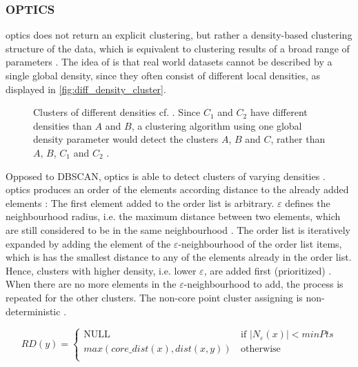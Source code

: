 \subsubsection{OPTICS}\label{subsec:optics}

\ac{optics} does not return an explicit clustering, but rather a density-based clustering structure of the data, 
which is equivalent to clustering results of a broad range of parameters \cite{OPTICS1999}.
The idea of \citeauthor{OPTICS1999} is that real world datasets cannot be described by a single global density, since they often consist of different local densities, 
as displayed in \autoref{fig:diff_density_cluster}.

\begin{figure}[htp] %
    \centering
    
    \caption{Clusters of different densities cf. \cite{OPTICS1999}.
    Since $C_1$ and $C_2$ have different densities than $A$ and $B$, a clustering algorithm using one global density parameter would detect the clusters $A$, $B$ and $C$, 
    rather than $A$, $B$, $C_1$ and $C_2$ .
    }
    \label{fig:diff_density_cluster}
\end{figure}

Opposed to DBSCAN, \ac{optics} is able to detect clusters of varying densities \cite{OPTICS2014}.
\ac{optics} produces an order of the elements according distance to the already added elements \cite{OPTICS2014, OPTICS2013}:
The first element added to the order list is arbitrary.
$\varepsilon$ defines the neighbourhood radius, i.e. the maximum distance between two elements, which are still considered to be in the same neighbourhood \cite{OPTICS_kMeans_2016}.
The order list is iteratively expanded by adding the element of the $\varepsilon$-neighbourhood of the order list items, which is has the smallest distance to any of the elements already in the order list.
Hence, clusters with higher density, i.e. lower $\varepsilon$, are added first (prioritized) \cite{OPTICS_kMeans_2016, OPTICS1999}.
When there are no more elements in the $\varepsilon$-neighbourhood to add, the process is repeated for the other clusters.
The non-core point cluster assigning is non-deterministic \cite{OPTICS2013}.

\begin{equation}
    RD(y) = \left\{
    \begin{array}{ll}
    \textrm{NULL} & \, \textrm{if |}N_\varepsilon (x)| < minPts \\
    max(core\_dist(x), dist(x,y)) & \, \textrm{otherwise} \\
    \end{array}
    \right. 
    \label{eq:optics-reachability-distance}
\end{equation}

